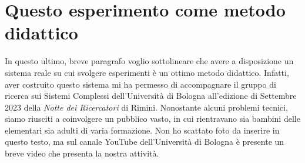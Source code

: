 \section{Questo esperimento come metodo didattico}
In questo ultimo, breve paragrafo voglio sottolineare che avere a disposizione
un sistema reale su cui svolgere esperimenti è un ottimo metodo didattico.
Infatti, aver costruito questo sistema mi ha permesso di 
accompagnare il gruppo di ricerca sui Sistemi Complessi dell'Università di Bologna
all'edizione di Settembre 2023 della \emph{Notte dei Ricercatori} di Rimini.
Nonostante alcuni problemi tecnici, siamo riusciti a coinvolgere un pubblico
vasto, in cui rientravano sia bambini delle elementari sia adulti di
varia formazione. Non ho scattato foto da inserire in questo testo,
ma sul canale YouTube dell'Università di Bologna è presente un breve
video che presenta la nostra attività.

